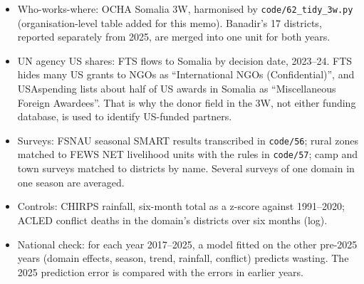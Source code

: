 \documentclass[11pt]{article}
\newcommand{\sh}[1]{\par\smallskip{\sffamily\bfseries #1}\par}
\begin{document}
\sh{Construction notes}
\begin{itemize}
  \item Who-works-where: OCHA Somalia 3W, harmonised by \texttt{code/62\_tidy\_3w.py} (organisation-level table added for this memo). Banadir's 17 districts, reported separately from 2025, are merged into one unit for both years.
  \item UN agency US shares: FTS flows to Somalia by decision date, 2023--24. FTS hides many US grants to NGOs as ``International NGOs (Confidential)'', and USAspending lists about half of US awards in Somalia as ``Miscellaneous Foreign Awardees''. That is why the donor field in the 3W, not either funding database, is used to identify US-funded partners.
  \item Surveys: FSNAU seasonal SMART results transcribed in \texttt{code/56}; rural zones matched to FEWS NET livelihood units with the rules in \texttt{code/57}; camp and town surveys matched to districts by name. Several surveys of one domain in one season are averaged.
  \item Controls: CHIRPS rainfall, six-month total as a z-score against 1991--2020; ACLED conflict deaths in the domain's districts over six months (log).
  \item National check: for each year 2017--2025, a model fitted on the other pre-2025 years (domain effects, season, trend, rainfall, conflict) predicts wasting. The 2025 prediction error is compared with the errors in earlier years.
\end{itemize}
\end{document}
